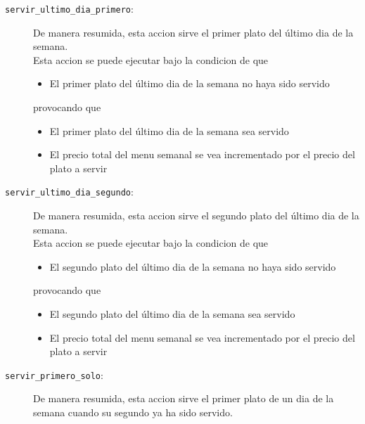 \begin{description}

  \item[\texttt{servir\_ultimo\_dia\_primero}:]

    De manera resumida, esta accion
    sirve el primer plato del último dia de la semana.
    \\

    Esta accion se puede ejecutar
    bajo la condicion de que
    \begin{itemize}
      \item El primer plato del último dia de la semana no haya sido servido
    \end{itemize}
    provocando que
    \begin{itemize}
      \item El primer plato del último dia de la semana sea servido
      \item El precio total del menu semanal se vea incrementado por el precio 
        del plato a servir
    \end{itemize}

  \item[\texttt{servir\_ultimo\_dia\_segundo}:]

    De manera resumida, esta accion
    sirve el segundo plato del último dia de la semana.
    \\

    Esta accion se puede ejecutar
    bajo la condicion de que
    \begin{itemize}
      \item El segundo plato del último dia de la semana no haya sido servido
    \end{itemize}
    provocando que
    \begin{itemize}
      \item El segundo plato del último dia de la semana sea servido
      \item El precio total del menu semanal se vea incrementado por el precio 
        del plato a servir
    \end{itemize}

  \item[\texttt{servir\_primero\_solo}:]

    De manera resumida, esta accion
    sirve el primer plato de un dia de la semana cuando su segundo
    ya ha sido servido.
    \\
    

\end{description}
